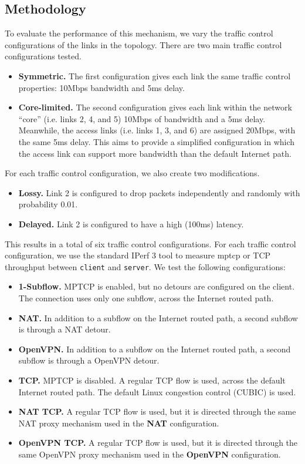 \documentclass{cwru}
\begin{document}
\subsection{Methodology}

To evaluate the performance of this mechanism, we vary the traffic control
configurations of the links in the topology. There are two main traffic control
configurations tested.

\begin{itemize}
\item \textbf{Symmetric.} The first configuration gives each link the same
  traffic control properties: 10Mbps bandwidth and 5ms delay.
\item \textbf{Core-limited.} The second configuration gives each link within the
  network ``core'' (i.e. links 2, 4, and 5) 10Mbps of bandwidth and a 5ms delay.
  Meanwhile, the access links (i.e. links 1, 3, and 6) are assigned 20Mbps, with
  the same 5ms delay. This aims to provide a simplified configuration in which
  the access link can support more bandwidth than the default Internet path.
\end{itemize}

For each traffic control configuration, we also create two modifications.

\begin{itemize}
\item \textbf{Lossy.} Link 2 is configured to drop packets independently and
  randomly with probability 0.01.
\item \textbf{Delayed.} Link 2 is configured to have a high (100ms) latency.
\end{itemize}

This results in a total of six traffic control configurations. For each traffic
control configuration, we use the standard IPerf 3 tool to measure \ac{mptcp} or
TCP throughput between \texttt{client} and \texttt{server}. We test the
following configurations:

\begin{itemize}
\item \textbf{1-Subflow.} MPTCP is enabled, but no detours are configured on the
  client. The connection uses only one subflow, across the Internet routed path.
\item \textbf{NAT.} In addition to a subflow on the Internet routed path, a
  second subflow is through a NAT detour.
\item \textbf{OpenVPN.} In addition to a subflow on the Internet routed path, a
  second subflow is through a OpenVPN detour.
\item \textbf{TCP.} MPTCP is disabled. A regular TCP flow is used, across the
  default Internet routed path. The default Linux congestion control (CUBIC) is
  used.
\item \textbf{NAT TCP.} A regular TCP flow is used, but it is directed through
  the same NAT proxy mechanism used in the \textbf{NAT} configuration.
\item \textbf{OpenVPN TCP.} A regular TCP flow is used, but it is directed
  through the same OpenVPN proxy mechanism used in the \textbf{OpenVPN}
  configuration.
\end{itemize}
\end{document}
